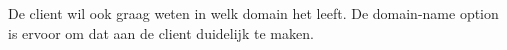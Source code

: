De client wil ook graag weten in welk domain het leeft. De domain-name option is ervoor om dat aan de client duidelijk te maken.
